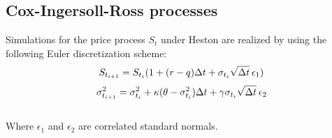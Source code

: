 
\subsection{Cox-Ingersoll-Ross processes}

Simulations for the price process $S_{t}$ under Heston are realized by using the following Euler discretization scheme:
$$S_{t_{i+1}} = S_{t_{i}}(1+(r-q)\Delta t + \sigma_{t_{i}} \sqrt{\Delta t} \hspace{0.2em}\epsilon_{1})$$
$$\sigma_{t_{i+1}}^2 = \sigma_{t_{i}}^2 + \kappa(\theta - \sigma_{t_{i}}^2)\Delta t + \gamma \sigma_{t_{i}}\sqrt{\Delta t} \hspace{0.2em}\epsilon_{2}$$\\
Where $\epsilon_{1}$ and $\epsilon_{2}$ are correlated standard normals.\\
